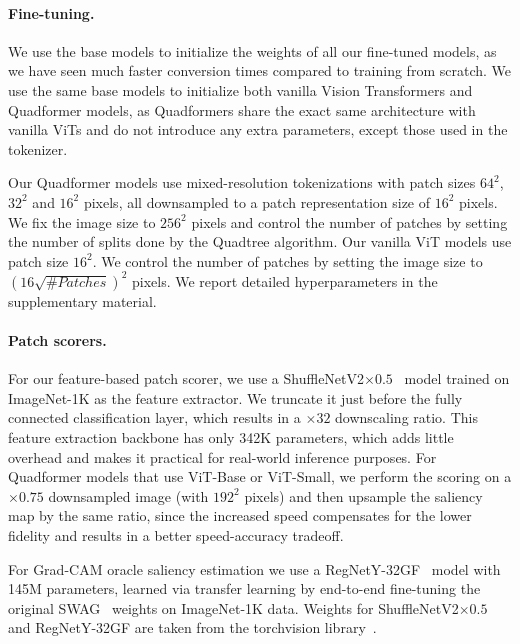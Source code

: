 \paragraph{Fine-tuning.}
We use the base models to initialize the weights of all our fine-tuned models, as we have seen much faster conversion times compared to training from scratch. We use the same base models to initialize both vanilla Vision Transformers and Quadformer models, as Quadformers share the exact same architecture with vanilla ViTs and do not introduce any extra parameters, except those used in the tokenizer.

Our Quadformer models use mixed-resolution tokenizations with patch sizes $64^2$, $32^2$ and $16^2$ pixels, all downsampled to a patch representation size of $16^2$ pixels. We fix the image size to $256^2$ pixels and control the number of patches by setting the number of splits done by the Quadtree algorithm. Our vanilla ViT models use patch size $16^2$. We control the number of patches by setting the image size to $(16\sqrt{\#Patches})^2$ pixels. We report detailed hyperparameters in the supplementary material.

\paragraph{Patch scorers.} \label{paragraph:impl_patch_scorers}
For our feature-based patch scorer, we use a ShuffleNetV2$\times0.5$~\cite{Ma2018ShuffleNetVP} model trained on ImageNet-1K as the feature extractor. We truncate it just before the fully connected classification layer, which results in a $\times32$ downscaling ratio. This feature extraction backbone has only 342K parameters\label{342k_params}, which adds little overhead and makes it practical for real-world inference purposes. For Quadformer models that use ViT-Base or ViT-Small, we perform the scoring on a $\times0.75$ downsampled image (with $192^2$ pixels) and then upsample the saliency map by the same ratio, since the increased speed compensates for the lower fidelity and results in a better speed-accuracy tradeoff.

For Grad-CAM oracle saliency estimation we use a RegNetY-32GF~\cite{Radosavovic2020DesigningND} model with 145M parameters, learned via transfer learning by end-to-end fine-tuning the original SWAG~\cite{Singh2022RevisitingWS} weights on ImageNet-1K data. Weights for ShuffleNetV2$\times0.5$ and RegNetY-32GF are taken from the torchvision library~\cite{torchvision2016}.

